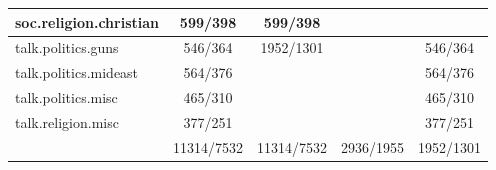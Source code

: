 \begin{tabular}{|l|c|c|c|c|}
soc.religion.christian   & 599/398    & 599/398                        &           &           \\ \hline
talk.politics.guns       & 546/364    & \multirow{4}{*}{1952/1301} &           & 546/364   \\ \cline{1-2} \cline{4-5} 
talk.politics.mideast    & 564/376    &                            &           & 564/376   \\ \cline{1-2} \cline{4-5} 
talk.politics.misc       & 465/310    &                            &           & 465/310   \\ \cline{1-2} \cline{4-5} 
talk.religion.misc       & 377/251    &                            &           & 377/251   \\ \hline
                         & 11314/7532 & 11314/7532                 & 2936/1955 & 1952/1301 \\ \hline
\end{tabular}
